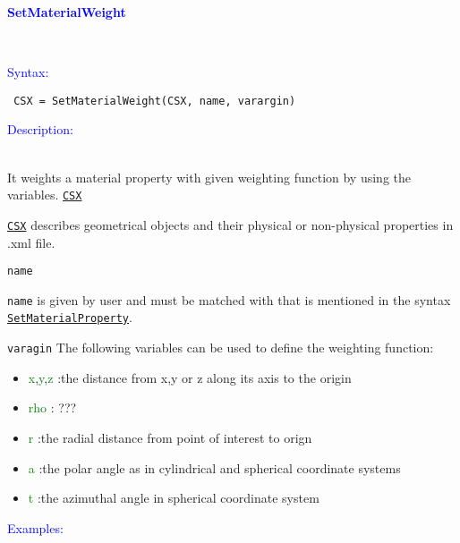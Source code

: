 \textcolor{blue}{\begin{large}\textbf{SetMaterialWeight}\end{large}}\\

\textcolor{blue}{\begin{large}Syntax:\end{large}}

  \begin{lstlisting}
 CSX = SetMaterialWeight(CSX, name, varargin)
  \end{lstlisting}
  
\textcolor{blue}{\begin{large}Description:\end{large}}\\
It weights a material property with given weighting function by using the variables.
 \hyperref[para:CSX]{\texttt{CSX}} 
 \begin{myindentpar}\hyperref[para:CSX]{\texttt{CSX}} describes geometrical objects and their physical or non-physical properties in .xml file.
 \end{myindentpar} 
 \texttt{name} 
 \begin{myindentpar}{\texttt{name}} is given by user and must be matched with that is mentioned in the syntax 
 \hyperref[para:SetMaterialProperty]{\texttt{SetMaterialProperty}}.
 \end{myindentpar} 
 \texttt{varagin} The following variables can be used to define the weighting function:
\begin{myindentpar} 
  \begin{itemize}
  \item \textcolor{green}{x},\textcolor{green}{y},\textcolor{green}{z} :the distance from x,y or z along its axis to the origin
  \item \textcolor{green}{rho}       : ???
  \item \textcolor{green}{r}         :the radial distance from point of interest to orign
  \item \textcolor{green}{a}         :the polar angle as in cylindrical and spherical coordinate systems
  \item \textcolor{green}{t}         :the azimuthal angle in spherical coordinate system 
  \end{itemize}
\end{myindentpar} 

\textcolor{blue}{\begin{large}Examples:\end{large}}\\

